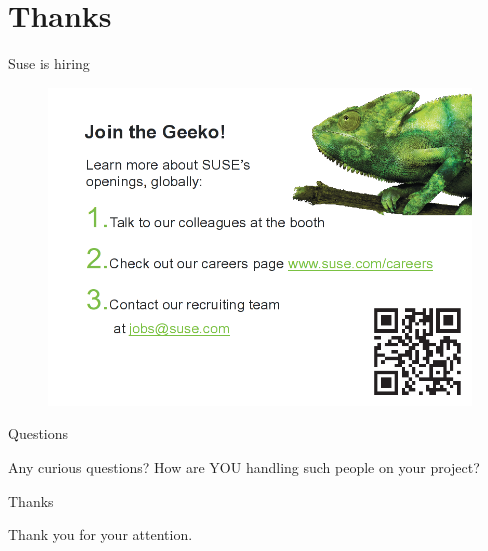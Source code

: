 \documentclass{beamer}
\begin{document}
\section{Thanks}

\begin{frame}{Suse is hiring}
	\begin{figure}
	\includegraphics[width= 0.8\linewidth]{suse_hiring.png}
	\end{figure}
\end{frame}

\begin{frame}{Questions}
	\begin{center}
	Any curious questions? How are YOU handling such people on your project?
	\end{center}
\end{frame}

\begin{frame}{Thanks}
	\begin{center}
	Thank you for your attention.
	\end{center}
\end{frame}
\end{document}
